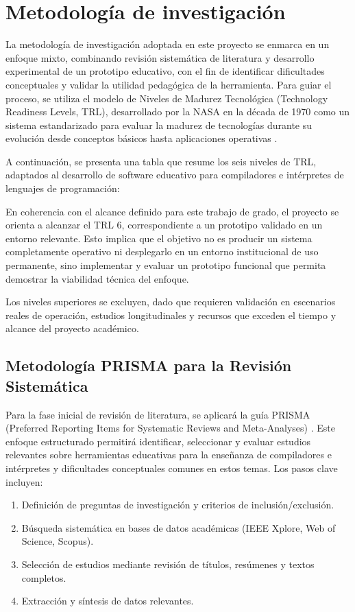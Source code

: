 \section{Metodología de investigación}

La metodología de investigación adoptada en este proyecto se enmarca en un enfoque mixto, combinando revisión sistemática de literatura y desarrollo experimental de un prototipo educativo, con el fin de identificar dificultades conceptuales y validar la utilidad pedagógica de la herramienta. Para guiar el proceso, se utiliza el modelo de Niveles de Madurez Tecnológica (Technology Readiness Levels, TRL), desarrollado por la NASA en la década de 1970 como un sistema estandarizado para evaluar la madurez de tecnologías durante su evolución desde conceptos básicos hasta aplicaciones operativas \cite{salazar-2023}.

A continuación, se presenta una tabla que resume los seis niveles de TRL, adaptados al desarrollo de software educativo para compiladores e intérpretes de lenguajes de programación:



En coherencia con el alcance definido para este trabajo de grado, el proyecto se orienta a alcanzar el TRL 6, correspondiente a un prototipo validado en un entorno relevante. Esto implica que el objetivo no es producir un sistema completamente operativo ni desplegarlo en un entorno institucional de uso permanente, sino implementar y evaluar un prototipo funcional que permita demostrar la viabilidad técnica del enfoque. 

Los niveles superiores se excluyen, dado que requieren validación en escenarios reales de operación, estudios longitudinales y recursos que exceden el tiempo y alcance del proyecto académico.

\subsection{Metodología PRISMA para la Revisión Sistemática}

Para la fase inicial de revisión de literatura, se aplicará la guía PRISMA (Preferred Reporting Items for Systematic Reviews and Meta-Analyses) \cite{Prisma2020}. Este enfoque estructurado permitirá identificar, seleccionar y evaluar estudios relevantes sobre herramientas educativas para la enseñanza de compiladores e intérpretes y dificultades conceptuales comunes en estos temas. Los pasos clave incluyen:
\begin{enumerate}
    \item Definición de preguntas de investigación y criterios de inclusión/exclusión.
    \item Búsqueda sistemática en bases de datos académicas (IEEE Xplore, Web of Science, Scopus).
    \item Selección de estudios mediante revisión de títulos, resúmenes y textos completos.
    \item Extracción y síntesis de datos relevantes.
\end{enumerate}

